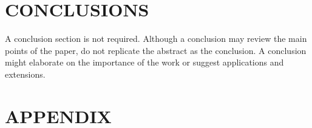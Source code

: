 \documentclass[letterpaper, 10 pt, conference]{ieeeconf}  %
\begin{document}
                                                                                     \section{CONCLUSIONS}

                                                                                     A conclusion section is not required. Although a conclusion may review the main points of the paper, do not replicate the abstract as the conclusion. A conclusion might elaborate on the importance of the work or suggest applications and extensions. 

                                                                                     \addtolength{\textheight}{-12cm}   %







                                                                                     \section*{APPENDIX}
\end{document}
